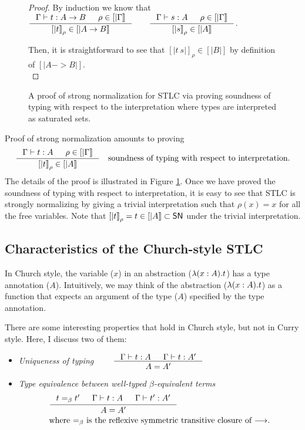 \begin{figure}
\begin{proof}
By induction we know that
$
\inference{\Gamma |- t : A -> B & \rho\in[|\Gamma|]}{[|t|]_\rho \in [|A -> B|]}
\qquad
\inference{\Gamma |- s : A & \rho\in[|\Gamma|]}{[|s|]_\rho \in [|A|]}
$.

Then, it is straightforward to see that $[|t~s|]_\rho\in[|B|]$
by definition of $[|A -> B|]$.\\
\end{proof}
\begin{singlespace}
\caption[Strong normalization proof for STLC]{
	A proof of strong normalization for STLC via proving
	soundness of typing with respect to the interpretation
        where types are interpreted as saturated sets.}
\label{fig:SNproofSTLC}
\end{singlespace}
\end{figure}

Proof of strong normalization amounts to proving
\[ \inference{\Gamma|- t:A & \rho \in [|\Gamma|]}{[|t|]_\rho \in [|A|]}
\quad \text{soundness of typing with respect to interpretation.}
\]
The details of the proof is illustrated in Figure \ref{fig:SNproofSTLC}.
Once we have proved the soundness of typing with respect to interpretation,
it is easy to see that STLC is strongly normalizing by giving a trivial
interpretation such that $\rho(x) = x$ for all the free variables. Note that
$[|t|]_\rho = t \in [|A|] \subset \mathsf{SN}$ under the trivial interpretation.

\subsection{Characteristics of the Church-style STLC}\label{sec:stlc:church}
In Church style, the variable ($x$) in an abstraction
($\lambda(x:A).t$) has a type annotation ($A$). Intuitively, we may think of
the abstraction ($\lambda(x:A).t$) as a function that expects an argument of
the type ($A$) specified by the type annotation.

There are some interesting properties that hold in Church style,
but not in Curry style. Here, I discuss two of them:
\begin{itemize}
\item \emph{Uniqueness of typing}
$\qquad\inference{\Gamma |- t : A & \Gamma |- t : A'}{A = A'} $

\item \emph{Type equivalence between well-typed $\beta$-equivalent terms}
\begin{align*}
& \inference{t =_{\beta} t' & \Gamma |- t : A & \Gamma |- t' : A'}{A = A'} \\
& \text{where $=_{\beta}$ is the reflexive symmetric transitive closure of $-->$.}
\end{align*}
\end{itemize}

